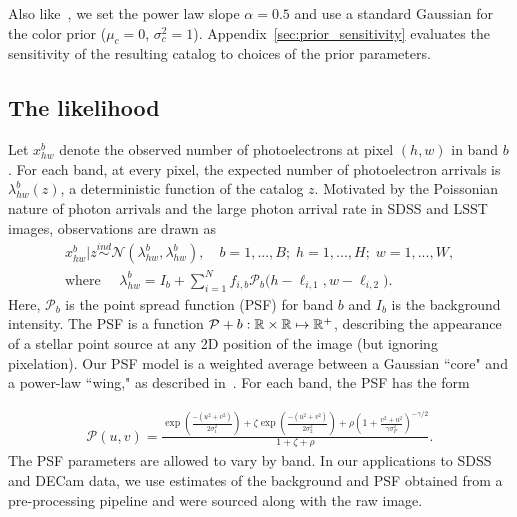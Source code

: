 Also like~\cite{Feder_2019}, we set the power law slope $\alpha = 0.5$ and use a standard Gaussian for the color prior ($\mu_c = 0$, $\sigma^2_c = 1$).
Appendix~\ref{sec:prior_sensitivity} evaluates the
sensitivity of the resulting catalog to choices of the prior parameters.

\subsection{The likelihood}
Let $x_{hw}^b$ denote the observed number of photoelectrons at pixel $(h,w)$ in band $b$.
For each band, at every pixel, the expected number of photoelectron arrivals is $\lambda^b_{hw}(z)$, a deterministic function of the catalog $z$. Motivated by the Poissonian nature of photon arrivals and
the large photon arrival rate in SDSS and LSST images,
observations are drawn as
\begin{align}
  x_{hw}^b | z \overset{ind}{\sim} \mathcal{N}(\lambda^b_{hw}, \lambda^b_{hw}),
  \quad
  b = 1, ..., B; \;
  h = 1,..., H; \;
  w = 1, ..., W, \\
 \text{where } \quad
 \lambda^b_{hw} = I_b + \sum_{i = 1}^N f_{i,b} \mathcal{P}_b\big(h - \ell_{i, 1}, w - \ell_{i, 2}\big).
  \label{eq:expected_intensity}
\end{align}
Here, $\mathcal{P}_b$ is the point spread function (PSF) for band $b$ and $I_b$ is the background intensity.
The PSF is a function
$\mathcal{P}+b : \mathbb{R} \times \mathbb{R} \mapsto \mathbb{R}^+$,
describing the appearance of a stellar point source at any 2D position of the image (but ignoring pixelation).
Our PSF model is a weighted average between a Gaussian ``core" and a power-law ``wing," as described in~\cite{Xin2018psf}. For each band, the PSF has the form

\begin{align}
    \mathcal{P}(u,v) =
    \frac{\exp(\frac{-(u^2 + v^2)}{2\sigma_1^2}) +
    \zeta \exp(\frac{-(u^2 + v^2)}{2\sigma_2^2}) +
    \rho(1 + \frac{v^2 + u^2}{\gamma\sigma^2_P})^{-\gamma/2} }{1 + \zeta + \rho}.
\end{align}
The PSF parameters are allowed to vary by band.
In our applications to SDSS and DECam data, we use estimates of the background
and PSF obtained from a pre-processing pipeline and were
sourced along with the raw image.


